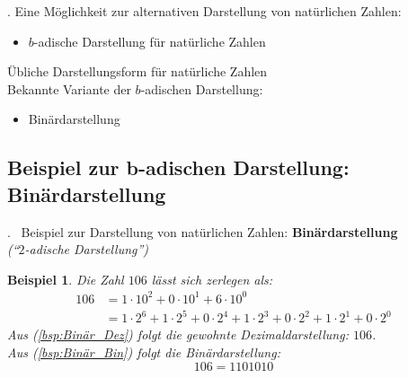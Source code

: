 \documentclass{beamer}
\newtheorem{beispiel}[satz]{Beispiel}
\newcommand{\secframe}{\begin{frame}{\insertsectionnumber. \insertsection}}
\newcommand{\subsecframe}{\begin{frame}{\insertsectionnumber.\insertsubsectionnumber \ \insertsubsection}}
\begin{document}
    \secframe
        Eine Möglichkeit zur alternativen Darstellung von natürlichen Zahlen: \\  
        \vspace{\baselineskip}
        \begin{itemize}
            \item $b$-adische Darstellung für natürliche Zahlen
        \end{itemize}
        \vspace{\baselineskip}
        Übliche Darstellungsform für natürliche Zahlen \\
        Bekannte Variante der $b$-adischen Darstellung:
        \begin{itemize}
            \item Binärdarstellung
        \end{itemize}
    \end{frame}

    \subsection{Beispiel zur b-adischen Darstellung: Binärdarstellung}

        \subsecframe
            Beispiel zur Darstellung von natürlichen Zahlen: \textbf{Binärdarstellung} \\
            \textit{(``$2$-adische Darstellung'')}
            \begin{beispiel} \label{bsp:Binär}
                Die Zahl $106$ lässt sich zerlegen als:
                \begin{align}
                    106 &= 1 \cdot 10^2 + 0 \cdot 10^1 + 6 \cdot 10^0 \label{bsp:Binär_Dez}\\
                    &= 1 \cdot 2^6 + 1 \cdot 2^5 + 0 \cdot 2^4 + 1 \cdot 2^3 + 0 \cdot 2^2 + 1 \cdot 2^1 + 0 \cdot 2^0 \label{bsp:Binär_Bin}
                \end{align}
                Aus (\ref{bsp:Binär_Dez}) folgt die gewohnte Dezimaldarstellung: $106$. \\
                Aus (\ref{bsp:Binär_Bin}) folgt die Binärdarstellung: \[106 = 1101010\]
            \end{beispiel}
        \end{frame}
\end{document}
